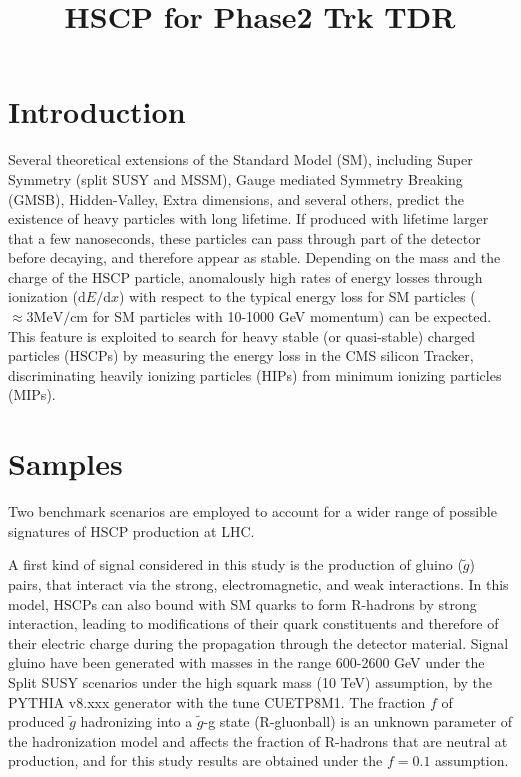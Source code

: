 \documentclass[11pt,twoside,a4paper]{article}
\title{HSCP for Phase2 Trk TDR}
\begin{document}
\section{Introduction}

Several theoretical extensions of the Standard Model (SM), including Super Symmetry (split SUSY and MSSM), Gauge mediated Symmetry Breaking (GMSB), Hidden-Valley, Extra dimensions, and several others, predict the existence of heavy particles with long lifetime.
If produced with lifetime larger that a few nanoseconds, these particles can pass through part of the detector before decaying, and therefore appear as stable.
Depending on the mass and the charge of the HSCP particle, anomalously high rates of energy losses through ionization ($\mathrm{d}E/\mathrm{d}x$) with respect to the typical energy loss for SM particles ($\approx 3 \mathrm{MeV}/\mathrm{cm}$ for SM particles with 10-1000 GeV momentum) can be expected. 
This feature is exploited to search for heavy stable (or quasi-stable) charged particles (HSCPs) by measuring the energy loss in the CMS silicon Tracker, discriminating heavily ionizing particles (HIPs) from minimum ionizing particles (MIPs).

\section{Samples}

Two benchmark scenarios are employed to account for a wider range of possible signatures of HSCP production at LHC.

A first kind of signal considered in this study is the production of gluino ($\tilde{g}$) pairs, that interact via the strong, electromagnetic, and weak interactions. 
In this model, HSCPs can also bound with SM quarks to form R-hadrons by strong interaction, leading to modifications of their quark constituents and therefore of their electric charge during the propagation through the detector material.
Signal gluino have been generated with masses in the range 600-2600 GeV under the Split SUSY scenarios under the high squark mass (10 TeV) assumption, by the PYTHIA v8.xxx generator with the tune CUETP8M1.
The fraction $f$ of produced $\tilde{g}$ hadronizing into a $\tilde{g}$-g state (R-gluonball) is an unknown parameter of the hadronization model and affects the fraction of R-hadrons that are neutral at production, and for this study results are obtained under the $f = 0.1$ assumption.
\end{document}
